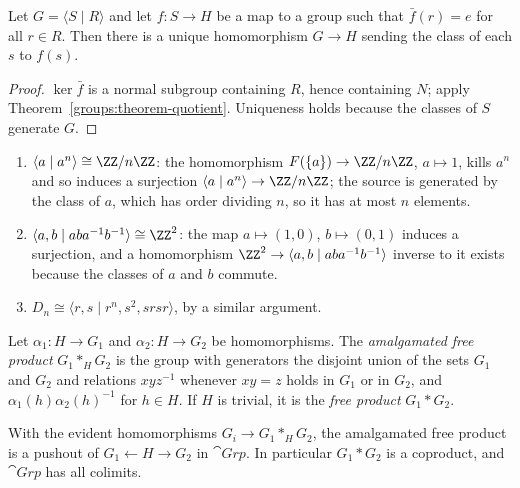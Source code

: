 \begin{proposition}\label{groups:proposition-presentation-property}
Let $G = \langle S \mid R \rangle$ and let $f \colon S \to H$ be a map to a group such that
$\bar f(r) = e$ for all $r \in R$. Then there is a unique homomorphism $G \to H$ sending
the class of each $s$ to $f(s)$.
\end{proposition}

\begin{proof}
$\ker \bar f$ is a normal subgroup containing $R$, hence containing $N$; apply
Theorem~\ref{groups:theorem-quotient}. Uniqueness holds because the classes of $S$
generate $G$.
\end{proof}

\begin{example}\label{groups:example-presentations}
\begin{enumerate}
\item $\langle a \mid a^n \rangle \cong \ZZ/n\ZZ$: the homomorphism $F(\{a\}) \to \ZZ/n\ZZ$,
$a \mapsto 1$, kills $a^n$ and so induces a surjection $\langle a \mid a^n \rangle \to \ZZ/n\ZZ$;
the source is generated by the class of $a$, which has order dividing $n$, so it has
at most $n$ elements.
\item $\langle a, b \mid aba^{-1}b^{-1} \rangle \cong \ZZ^2$: the map $a \mapsto (1, 0)$,
$b \mapsto (0, 1)$ induces a surjection, and a homomorphism
$\ZZ^2 \to \langle a, b \mid aba^{-1}b^{-1} \rangle$ inverse to it exists because the classes of $a$
and $b$ commute.
\item $D_n \cong \langle r, s \mid r^n, s^2, srsr \rangle$, by a similar argument.
\end{enumerate}
\end{example}

\begin{definition}\label{groups:definition-amalgam}
Let $\alpha_1 \colon H \to G_1$ and $\alpha_2 \colon H \to G_2$ be homomorphisms. The
\emph{amalgamated free product} $G_1 *_H G_2$ is the group with generators the
disjoint union of the sets $G_1$ and $G_2$ and relations $x y z^{-1}$ whenever $xy = z$
holds in $G_1$ or in $G_2$, and $\alpha_1(h)\alpha_2(h)^{-1}$ for $h \in H$. If $H$ is trivial,
it is the \emph{free product} $G_1 * G_2$.
\end{definition}

\begin{proposition}\label{groups:proposition-amalgam-pushout}
With the evident homomorphisms $G_i \to G_1 *_H G_2$, the amalgamated free product is a
pushout of $G_1 \leftarrow H \rightarrow G_2$ in $\cat{Grp}$. In particular $G_1 * G_2$ is a
coproduct, and $\cat{Grp}$ has all colimits.
\end{proposition}

